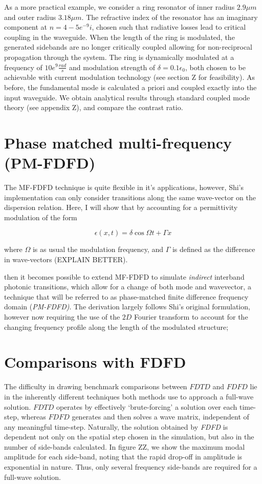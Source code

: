 As a more practical example, we consider a ring resonator of inner radius $2.9 \mu m$ and outer radius $3.18 \mu m$. The refractive index of the resonator has an imaginary component at $n=4-5e^{-9}i$, chosen such that radiative losses lead to critical coupling in the waveguide. When the length of the ring is modulated, the generated sidebands are no longer critically coupled allowing for non-reciprocal propagation through the system.  The ring is dynamically modulated at a frequency of $10e^9 \frac{rad}{s}$ and modulation strength of $\delta = 0.1 \epsilon_0$, both chosen to be achievable with current modulation technology (see section Z for feasibility). As before, the fundamental mode is calculated a priori and coupled exactly into the input waveguide. We obtain analytical results through standard coupled mode theory (see appendix Z), and compare the contrast ratio. 


\section{Phase matched multi-frequency (PM-FDFD)}
The MF-FDFD technique is quite flexible in it's applications, however, Shi's implementation can only consider transitions along the same wave-vector on the dispersion relation. Here, I will show that by accounting for a permittivity modulation of the form

\begin{equation}
	\epsilon(x,t)=\delta \cos{\Omega t + \Gamma x}
\end{equation}

where $\Omega$ is as usual the modulation frequency, and $\Gamma$ is defined as the difference in wave-vectors (EXPLAIN BETTER).

then it becomes possible to extend MF-FDFD to simulate \textit{indirect} interband photonic transitions, which allow for a change of both mode and wavevector, a technique that will be referred to as phase-matched finite difference frequency domain (\textit{PM-FDFD)}. The derivation largely follows Shi's original formulation, however now requiring the use of the $2D$ Fourier transform to account for the changing frequency profile along the length of the modulated structure;



\section{Comparisons with FDFD}

The difficulty in drawing benchmark comparisons between $FDTD$ and $FDFD$ lie in the inherently different techniques both methods use to approach a full-wave solution. $FDTD$ operates by effectively `brute-forcing' a solution over each time-step, whereas $FDFD$ generates and then solves a wave matrix, independent of any meaningful time-step. Naturally, the solution obtained by \textit{FDFD} is dependent not only on the spatial step chosen in the simulation, but also in the number of side-bands calculated. In figure ZZ, we show the maximum modal amplitude for each side-band, noting that the rapid drop-off in amplitude is exponential in nature. Thus, only several frequency side-bands are required for a full-wave solution. 

